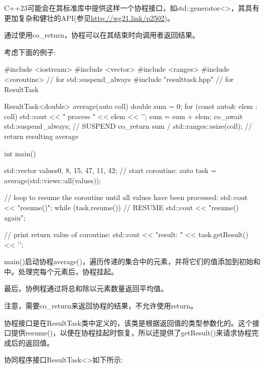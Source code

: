 C++23可能会在其标准库中提供这样一个协程接口，如std::generator<>，其具有更加复杂和健壮的API(参见\url{http://wg21.link/p2502})。


通过使用co\_return，协程可以在其结束时向调用者返回结果。

考虑下面的例子:


\begin{cpp}
#include <iostream>
#include <vector>
#include <ranges>
#include <coroutine> // for std::suspend_always{}
#include "resulttask.hpp" // for ResultTask

ResultTask<double> average(auto coll)
{
	double sum = 0;
	for (const auto& elem : coll) {
		std::cout << " process " << elem << '\n';
		sum = sum + elem;
		co_await std::suspend_always{}; // SUSPEND
	}
	co_return sum / std::ranges::ssize(coll); // return resulting average
}

int main()
{
	std::vector values{0, 8, 15, 47, 11, 42};
	// start coroutine:
	auto task = average(std::views::all(values));

	// loop to resume the coroutine until all values have been processed:
	std::cout << "resume()\n";
	while (task.resume()) { // RESUME
		std::cout << "resume() again\n";
	}

	// print return value of coroutine:
	std::cout << "result: " << task.getResult() << '\n';
}
\end{cpp}

main()启动协程average()，遍历传递的集合中的元素，并将它们的值添加到初始和中。处理完每个元素后，协程挂起。

最后，协例程通过将总和除以元素数量返回平均值。

注意，需要co\_return来返回协程的结果，不允许使用return。

协程接口是在ResultTask类中定义的，该类是根据返回值的类型参数化的。这个接口提供resume()，以便在协程挂起时恢复，所以还提供了getResult()来请求协程完成后的返回值。

协同程序接口ResultTask<>如下所示:


